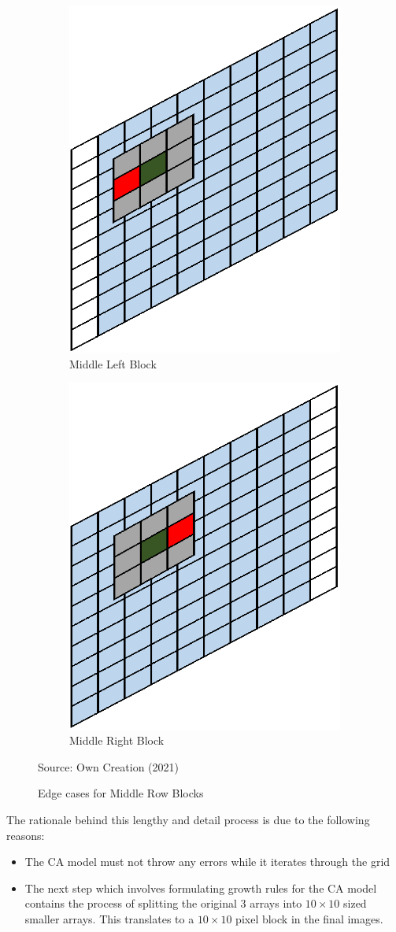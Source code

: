 \begin{figure}[H]
\centering
\begin{subfigure}{.4\textwidth}
  \centering
  \includegraphics[width=.5\linewidth]{Figures/Chapter3/midleft}
  \caption{Middle Left Block}
\end{subfigure}%
\begin{subfigure}{.4\textwidth}
  \centering
  \includegraphics[width=.5\linewidth]{Figures/Chapter3/midright}
  \caption{Middle Right Block}
\end{subfigure}
\caption{Edge cases for Middle Row Blocks}
\begin{center}
Source: Own Creation (2021)
\end{center}
\label{fig:e4}
\end{figure}
The rationale behind this lengthy and detail process is due to the following reasons:
\begin{itemize}
\item The CA model must not throw any errors while it iterates through the grid
\item The next step which involves formulating growth rules for the CA model contains the process of splitting the original 3 arrays into $10 \times 10$ sized smaller arrays. This translates to a $10 \times 10$ pixel block in the final images.
\end{itemize}
